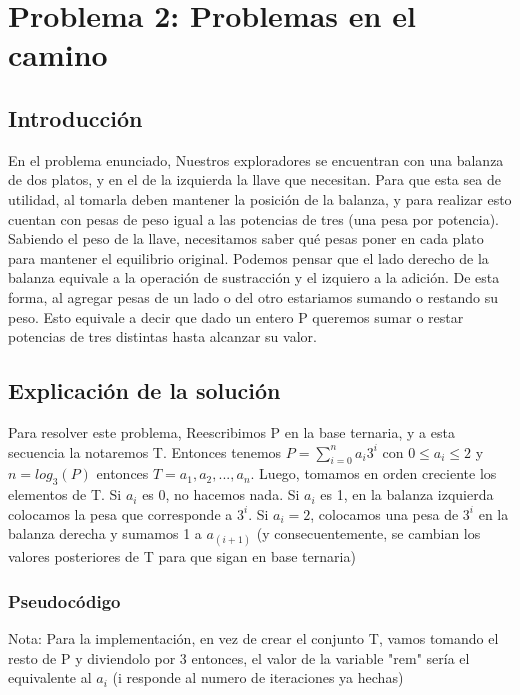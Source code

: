 \documentclass[spanish,12pt]{article}
\begin{document}
\section{Problema 2: Problemas en el camino}

\subsection{Introducción}

En el problema enunciado, Nuestros exploradores se encuentran con una balanza de dos platos, y en el de la izquierda la llave que necesitan. Para que esta sea de utilidad, al tomarla deben mantener la posición de la balanza, y para realizar esto cuentan con pesas de peso igual a las potencias de tres (una pesa por potencia).
Sabiendo el peso de la llave, necesitamos saber qué pesas poner en cada plato para mantener el equilibrio original.
Podemos pensar que el lado derecho de la balanza equivale a la operación de sustracción y el izquiero a la adición. De esta forma, al agregar pesas de un lado o del otro estariamos sumando o restando su peso.
Esto equivale a decir que dado un entero P queremos sumar o restar potencias de tres distintas hasta alcanzar su valor.

\subsection{Explicación de la solución}

Para resolver este problema, Reescribimos P en la base ternaria, y a esta secuencia la notaremos T. Entonces tenemos $P = \sum_{i=0}^{n} a_i3^i$  con $0 \leq a_i \leq 2$ y $n = log_{3}{(P)}$  entonces $T ={a_1,a_2,...,a_n}$.
Luego, tomamos en orden creciente los elementos de T. Si $a_i$ es 0, no hacemos nada. Si $a_i$ es 1, en la balanza izquierda colocamos la pesa que corresponde a $3^i$. Si $a_i =2$, colocamos una pesa de $3^i$ en la balanza derecha y sumamos 1 a $a_{(i+1)}$ (y consecuentemente, se cambian los valores posteriores de T para que sigan en base ternaria)


\subsubsection{Pseudocódigo}

Nota: Para la implementación, en vez de crear el conjunto T, vamos tomando el resto de P y diviendolo por 3 entonces, el valor de la variable "rem" sería el equivalente al $a_i$ (i responde al numero de iteraciones ya hechas)
\end{document}
